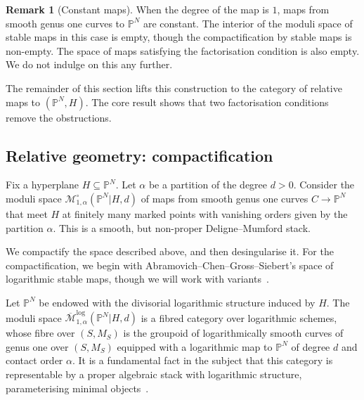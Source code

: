 \documentclass[11pt]{amsart}
\newcommand{\PP}{\mathbb P}
\renewcommand{\to}{\rightarrow}
\theoremstyle{definition}
\theoremstyle{definition}
\newtheorem{remark}[thm]{Remark}
\begin{document}
\begin{remark}[Constant maps]\label{rem: constant-maps}
When the degree of the map is $1$, maps from smooth genus one curves to $\PP^N$ are constant. The interior of the moduli space of stable maps in this case is empty, though the compactification by stable maps is non-empty. The space of maps satisfying the factorisation condition is also empty. We do not indulge on this any further. 
\end{remark}

The remainder of this section lifts this construction to the category of relative maps to $(\mathbb P^N,H)$. The core result shows that two factorisation conditions remove the obstructions. 

\subsection{Relative geometry: compactification} Fix a hyperplane $H\subseteq \mathbb P^N$. Let $\alpha$ be a partition of the degree $d>0$. Consider the moduli space $\mathcal M_{1,\alpha}^\circ(\mathbb P^N|H,d)$ of maps from smooth genus one curves $C\to \mathbb P^N$ that meet $H$ at finitely many marked points with vanishing orders given by the partition $\alpha$. This is a smooth, but non-proper Deligne--Mumford stack. 

We compactify the space described above, and then desingularise it. For the compactification, we begin with Abramovich--Chen--Gross--Siebert's space of logarithmic stable maps, though we will work with variants~\cite{AbramovichChenLog,ChenLog,GrossSiebertLog,KimLog}.

Let $\PP^N$ be endowed with the divisorial logarithmic structure induced by $H$. The moduli space $\overline{\mathcal{M}}^{\operatorname{log}}_{1,\alpha}(\mathbb P^N|H,d)$ is a fibred category over logarithmic schemes, whose fibre over $(S,M_S)$ is the groupoid of logarithmically smooth curves of genus one over $(S,M_S)$ equipped with a logarithmic map to $\mathbb P^N$ of degree $d$ and contact order $\alpha$. It is a fundamental fact in the subject that this category is representable by a proper algebraic stack with logarithmic structure, parameterising minimal objects~\cite{ChenLog}. 

\begin{comment}
There is a representable finite logarithmic morphism to the Kontsevich space, forgetting the logarithmic structure on the target:
$$
\overline{\mathcal M}^{\mathrm{log}}_{1,\alpha}(\mathbb P^N|H,d) \to \overline{\mathcal M}_{1,n}(\mathbb P^N,d).
$$
\end{comment}
\end{document}
